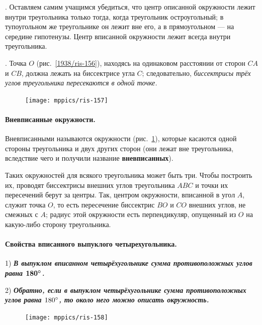\documentclass[oneside]{book}
\makeatletter
\newcommand{\rindex}[2][\imki@jobname]{%
  \index[#1]{\detokenize{#2}}%
}
\makeatother
\begin{document}
{\sloppy 

\smallskip
{}.
Оставляем самим учащимся убедиться, что центр описанной окружности лежит внутри треугольника только тогда, когда треугольник остроугольный;
в тупоугольном же треугольнике он лежит вне его, а в прямоугольном — на середине гипотенузы.
Центр вписанной окружности лежит всегда внутри треугольника.

}

\smallskip
{}.
Точка $O$ (рис.~\ref{1938/ris-156}), находясь на одинаковом расстоянии от сторон $CA$ и $CB$, должна лежать на биссектрисе угла $C$;
следовательно, \emph{биссектрисы трёх углов треугольника пересекаются в одной точке.}

\begin{figure}
\centering
\texttt{[image: mppics/ris-157]}
\caption{}\label{1938/ris-157}
\end{figure}

\paragraph{Вневписанные окружности.}\label{1938/138}
Вневписанными называются окружности (рис.~\ref{1938/ris-157}), которые касаются одной стороны треугольника и  двух других сторон (они лежат вне треугольника, вследствие чего и получили название \rindex{вневписанная окружность}\textbf{вневписанных}).


Таких окружностей для всякого треугольника может быть три.
Чтобы построить их, проводят биссектрисы внешних углов треугольника $ABC$ и точки их пересечений берут за центры.
Так, центром окружности, вписанной в угол $A$, служит точка $O$, то есть
пересечение биссектрис $BO$ и $CO$ внешних углов, не смежных с $A$;
радиус этой окружности есть перпендикуляр, опущенный из $O$ на какую-либо сторону треугольника.

\paragraph{Свойства вписанного выпуклого четырехугольника.}\label{1938/139}
1) \textbf{\emph{В выпуклом вписанном четырёхугольнике сумма противоположных углов равна $\bm{180\degree}$.}}

2) \textbf{\emph{Обратно, если в выпуклом четырёхугольнике сумма противоположных углов равна $180\degree$, то около него можно описать окружность.}}

\begin{figure}
\centering
\texttt{[image: mppics/ris-158]}
\caption{}\label{1938/ris-158}
\end{figure}
\end{document}
